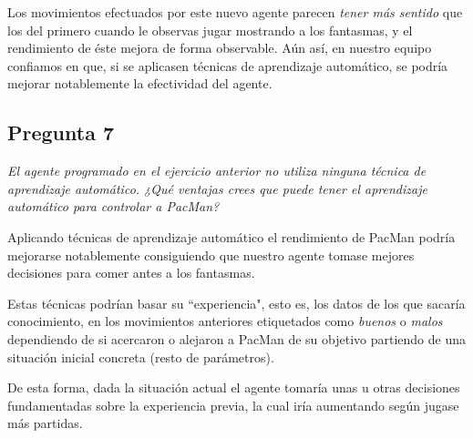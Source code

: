 \documentclass[12pt]{article}
\begin{document}
Los movimientos efectuados por este nuevo agente parecen \emph{tener más
sentido} que los del primero cuando le observas jugar mostrando a los fantasmas,
y el rendimiento de éste mejora de forma observable. Aún así, en nuestro equipo
confiamos en que, si se aplicasen técnicas de aprendizaje automático, se podría
mejorar notablemente la efectividad del agente.

\newpage
\begin{center}
\section{Pregunta 7}

\emph{El agente programado en el ejercicio anterior no utiliza ninguna técnica
de aprendizaje automático. ¿Qué ventajas crees que puede tener el aprendizaje
automático para controlar a PacMan?}
\end{center}

Aplicando técnicas de aprendizaje automático el rendimiento de PacMan podría
mejorarse notablemente consiguiendo que nuestro agente tomase mejores
decisiones para comer antes a los fantasmas.

Estas técnicas podrían basar su ``experiencia", esto es, los datos de los que
sacaría conocimiento, en los movimientos anteriores etiquetados como
\emph{buenos} o \emph{malos} dependiendo de si acercaron o alejaron a PacMan de
su objetivo partiendo de una situación inicial concreta (resto de parámetros).

De esta forma, dada la situación actual el agente tomaría unas u otras
decisiones fundamentadas sobre la experiencia previa, la cual iría aumentando
según jugase más partidas.
\end{document}
